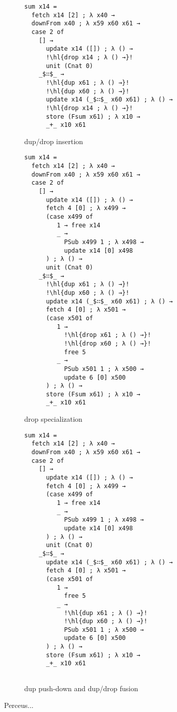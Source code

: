 \documentclass[10pt, twocolumn]{article}
\newcommand{\hl}[2][lightgray]{\colorbox{#1}{#2}}
\begin{document}
\begin{figure*}[hptb]
\begin{mdframed}
\centering
\setlength{\fboxsep}{0pt} %
\begin{subfigure}[t]{0.50\textwidth}
\centering
\begin{lstlisting}
sum x14 =
  fetch x14 [2] ; λ x40 →
  downFrom x40 ; λ x59 x60 x61 →
  case 2 of
    [] →
      update x14 ([]) ; λ () →
      !\hl{drop x14 ; λ () →}!
      unit (Cnat 0)
    _$∷$_ →
      !\hl{dup x61 ; λ () →}!
      !\hl{dup x60 ; λ () →}!
      update x14 (_$∷$_ x60 x61) ; λ () →
      !\hl{drop x14 ; λ () →}!
      store (Fsum x61) ; λ x10 →
      _+_ x10 x61
\end{lstlisting}
\caption{dup/drop insertion}
\label{fig:drop-insert}
\end{subfigure}\par\medskip
\begin{subfigure}[b]{0.48\textwidth}
\centering
\begin{lstlisting}
sum x14 =
  fetch x14 [2] ; λ x40 →
  downFrom x40 ; λ x59 x60 x61 →
  case 2 of
    [] →
      update x14 ([]) ; λ () →
      fetch 4 [0] ; λ x499 →
      (case x499 of
         1 → free x14
         _ →
           PSub x499 1 ; λ x498 →
           update x14 [0] x498
      ) ; λ () →
      unit (Cnat 0)
    _$∷$_ →
      !\hl{dup x61 ; λ () →}!
      !\hl{dup x60 ; λ () →}!
      update x14 (_$∷$_ x60 x61) ; λ () →
      fetch 4 [0] ; λ x501 →
      (case x501 of
         1 →
           !\hl{drop x61 ; λ () →}!
           !\hl{drop x60 ; λ () →}!
           free 5
         _ →
           PSub x501 1 ; λ x500 →
           update 6 [0] x500
      ) ; λ () →
      store (Fsum x61) ; λ x10 →
      _+_ x10 x61
\end{lstlisting}
\caption{drop specialization}
\label{fig:drop-spec}
\end{subfigure}
\begin{subfigure}[b]{0.48\textwidth}
\begin{lstlisting}[showlines=true]
sum x14 =
  fetch x14 [2] ; λ x40 →
  downFrom x40 ; λ x59 x60 x61 →
  case 2 of
    [] →
      update x14 ([]) ; λ () →
      fetch 4 [0] ; λ x499 →
      (case x499 of
         1 → free x14
         _ →
           PSub x499 1 ; λ x498 →
           update x14 [0] x498
      ) ; λ () →
      unit (Cnat 0)
    _$∷$_ →
      update x14 (_$∷$_ x60 x61) ; λ () →
      fetch 4 [0] ; λ x501 →
      (case x501 of
         1 →
           free 5
         _ →
           !\hl{dup x61 ; λ () →}!
           !\hl{dup x60 ; λ () →}!
           PSub x501 1 ; λ x500 →
           update 6 [0] x500
      ) ; λ () →
      store (Fsum x61) ; λ x10 →
      _+_ x10 x61


\end{lstlisting}
\caption{dup push-down and dup/drop fusion}
\label{fig:dup/drop-fusion}
\end{subfigure}
\end{mdframed}
\caption{Perceus...}
\label{fig:drop-specialization}
\end{figure*}
\end{document}
